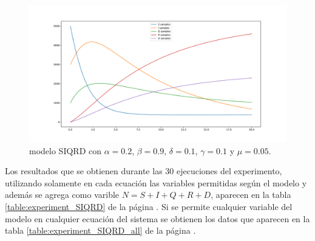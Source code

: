 \begin{figure}[h]
    \centering
    \includegraphics[width=\textwidth]{"figures/SIQRD.pdf"}
    \caption{modelo SIQRD con $\alpha = 0.2$, $\beta = 0.9$, $\delta = 0.1$, $\gamma = 0.1$ y $\mu = 0.05$.}
    \label{fig:SIQRD}
\end{figure}

Los resultados que se obtienen durante las 30 ejecuciones del experimento, utilizando solamente en cada ecuación las variables permitidas según el modelo y además se agrega como varible $N=S + I + Q + R + D$, aparecen en la tabla \ref{table:experiment_SIQRD} de la página \pageref{table:experiment_SIQRD}. Si se permite cualquier variable del modelo en cualquier ecuación del sistema se obtienen los datos que aparecen en la tabla \ref{table:experiment_SIQRD_all} de la página \pageref{table:experiment_SIQRD_all}.

